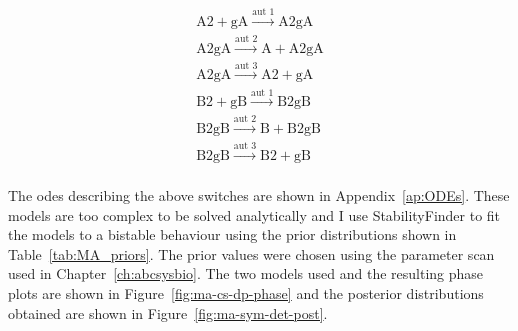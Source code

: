 $$
\begin{array}{cccc} 
    \textrm{A2} + \textrm{gA} \stackrel{\textrm{aut 1}}{\longrightarrow} \textrm{A2gA} \\
    \textrm{A2gA} \stackrel{\textrm{aut 2}}{\longrightarrow} \textrm{A} + \textrm{A2gA}\\
    \textrm{A2gA} \stackrel{\textrm{aut 3}}{\longrightarrow} \textrm{A2}+ \textrm{gA}  \\
    \textrm{B2} + \textrm{gB} \stackrel{\textrm{aut 1}}{\longrightarrow} \textrm{B2gB} \\
    \textrm{B2gB} \stackrel{\textrm{aut 2}}{\longrightarrow} \textrm{B} + \textrm{B2gB}\\
    \textrm{B2gB} \stackrel{\textrm{aut 3}}{\longrightarrow} \textrm{B2}+ \textrm{gB}  \\
\end{array}
$$

The \acrshort{ode}s describing the above switches are shown in Appendix~\ref{ap:ODEs}. These models are too complex to be solved analytically and I use StabilityFinder to fit the models to a bistable behaviour using the prior distributions shown in Table~\ref{tab:MA_priors}. The prior values were chosen using the parameter scan used in Chapter~\ref{ch:abcsysbio}. The two models used and the resulting phase plots are shown in Figure~\ref{fig:ma-cs-dp-phase} and the posterior distributions obtained are shown in Figure~\ref{fig:ma-sym-det-post}. 


